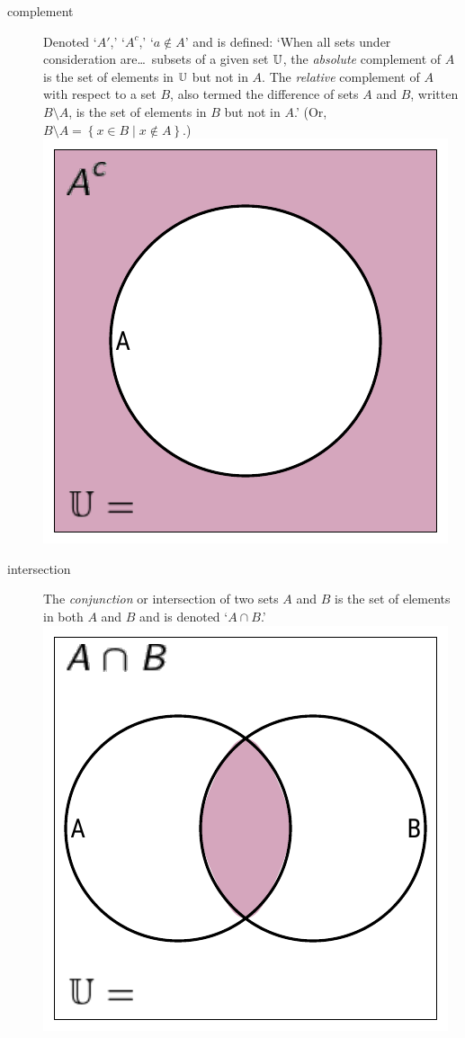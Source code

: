 \documentclass[11pt]{article}%
\begin{document}
\begin{multicols}{2}
\begin{description}
\item[complement] Denoted `$A'$,' `$A^c$,' `$a \notin A$' and is defined: `When all sets under consideration are\dots\ subsets of a given set $\mathbb{U}$, the \textit{absolute} complement of $A$ is the set of elements in $\mathbb{U}$ but not in $A$. The \textit{relative} complement of $A$ with respect to a set $B$, also termed the difference of sets $A$ and $B$, written $B \setminus A$, is the set of elements in $B$ but not in $A$.' \parencite{wiki:complement-set-theory} (Or, $B \setminus A = \left\{ x \in B \mid x \notin A \right\}$.) \includegraphics*[scale = 0.75]{../../images/venn-complement.pdf}

\item[intersection] The \textit{conjunction} or intersection of two sets $A$ and $B$ is the set of elements in both $A$ and $B$ and is denoted `$A \cap B$.' \includegraphics*[scale = 0.75]{../../images/venn-2-and.pdf}


\end{description}
\end{multicols}
\end{document}
